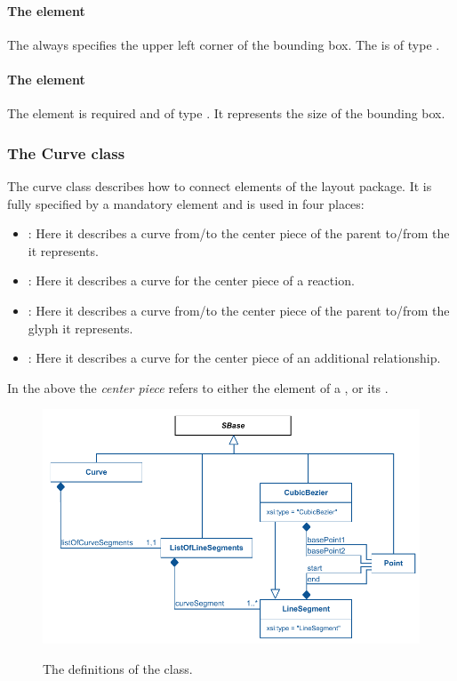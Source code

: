 \paragraph{The  element} The  always 
specifies the upper left corner of the bounding box. The 
 is of type \Point. 

\paragraph{The  element} The  
element is required and of type \Dimensions. It represents the size of
the bounding box.

\subsubsection{The Curve class } \label{curve-class} The curve class 
describes how to connect elements of the layout package. It is fully 
specified by a mandatory  element and is used 
in four places: 

\begin{itemize}

	\item {\SpeciesReferenceGlyph: Here it describes a curve from/to 
	the center piece of the parent \ReactionGlyph to/from the 
	\SpeciesGlyph it represents.}
	\item {\ReactionGlyph: Here it describes a curve for the 
	center piece of a reaction. }	
	\item {\ReferenceGlyph: Here it describes a curve from/to 
	the center piece of the parent \GeneralGlyph to/from the glyph 
	it represents.}
	\item {\GeneralGlyph: Here it describes a curve for the 
	center piece of an additional relationship. }	
	
\end{itemize}

In the above the \textit{center piece} refers to either the \Curve 
element of a \ReactionGlyph, or its \BoundingBox. 

\begin{figure}[!ht]
\includegraphics{uml/layout-curve-uml}\\
\caption{The definitions of the \Curve class.}
\label{uml:curve}
\end{figure}

